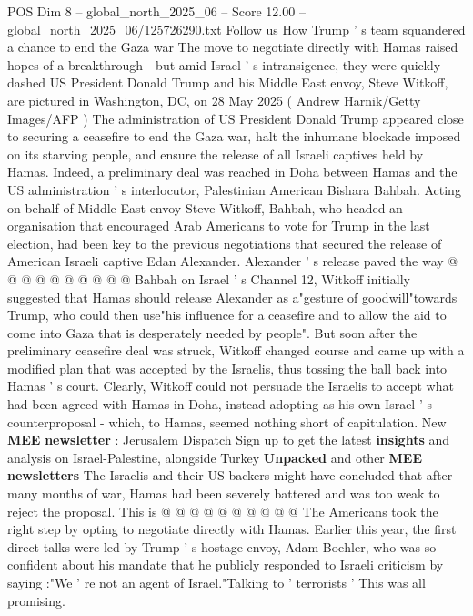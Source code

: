 \begin{textsample}{POS Dim 8 – global\_north\_2025\_06 – Score 12.00 – global\_north\_2025\_06/125726290.txt}  \label{ex:f8_pos_050}
Follow us How Trump ' s team squandered a chance to end the Gaza war The move to negotiate directly with Hamas raised hopes of a breakthrough - but amid Israel ' s intransigence, they were quickly dashed US President Donald Trump and his Middle East envoy, Steve Witkoff, are pictured in Washington, DC, on 28 May 2025 ( Andrew Harnik/Getty Images/AFP ) The administration of US President Donald Trump appeared close to securing a ceasefire to end the Gaza war, halt the inhumane blockade imposed on its starving people, and ensure the release of all Israeli captives held by Hamas.
Indeed, a preliminary deal was reached in Doha between Hamas and the US administration ' s interlocutor, Palestinian American Bishara Bahbah.
Acting on behalf of Middle East envoy Steve Witkoff, Bahbah, who headed an organisation that encouraged Arab Americans to vote for Trump in the last election, had been key to the previous negotiations that secured the release of American Israeli captive Edan Alexander.
Alexander ' s release paved the way @ @ @ @ @ @ @ @ @ @ Bahbah on Israel ' s Channel 12, Witkoff initially suggested that Hamas should release Alexander as a"gesture of goodwill"towards Trump, who could then use"his influence for a ceasefire and to allow the aid to come into Gaza that is desperately needed by people".
But soon after the preliminary ceasefire deal was struck, Witkoff changed course and came up with a modified plan that was accepted by the Israelis, thus tossing the ball back into Hamas ' s court.
Clearly, Witkoff could not persuade the Israelis to accept what had been agreed with Hamas in Doha, instead adopting as his own Israel ' s counterproposal - which, to Hamas, seemed nothing short of capitulation.
New \textbf{MEE} \textbf{newsletter} : Jerusalem Dispatch Sign up to get the latest \textbf{insights} and analysis on Israel-Palestine, alongside Turkey \textbf{Unpacked} and other \textbf{MEE} \textbf{newsletters} The Israelis and their US backers might have concluded that after many months of war, Hamas had been severely battered and was too weak to reject the proposal.
This is @ @ @ @ @ @ @ @ @ @ The Americans took the right step by opting to negotiate directly with Hamas.
Earlier this year, the first direct talks were led by Trump ' s hostage envoy, Adam Boehler, who was so confident about his mandate that he publicly responded to Israeli criticism by saying :"We ' re not an agent of Israel."Talking to ' terrorists ' This was all promising.

\end{textsample}

